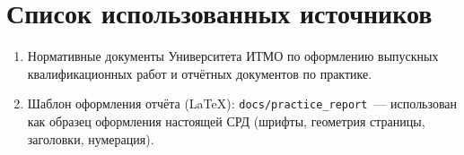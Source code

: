 \section{Список использованных источников}

\begin{enumerate}
  \item Нормативные документы Университета ИТМО по оформлению выпускных квалификационных работ и отчётных документов по практике.
  \item Шаблон оформления отчёта (LaTeX): \texttt{docs/practice\_report}~--- использован как образец оформления настоящей СРД (шрифты, геометрия страницы, заголовки, нумерация).
\end{enumerate}
